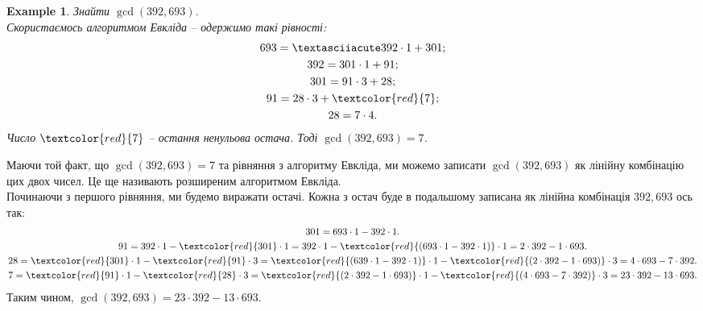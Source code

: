 \documentclass[a4paper, 10pt]{article}
\theoremstyle{theoremdd}
\theoremstyle{theoremdd}
\theoremstyle{theoremdd}
\theoremstyle{theoremdd}
\newtheorem{example}[theorem]{Example}
\theoremstyle{theoremdd}
\theoremstyle{theoremdd}
\theoremstyle{theoremdd}
\theoremstyle{theoremdd}
\begin{document}
\begin{example}
\label{gcd using Euclidean}
Знайти $\gcd(392, 693)$.\\
Скористаємось алгоритмом Евкліда -- одержимо такі рівності:
\begin{gather*}
693 =´392 \cdot 1 + 301; \\
392 = 301 \cdot 1 + 91; \\
301 = 91 \cdot 3 + 28; \\
91 = 28 \cdot 3 + \textcolor{red}{7}; \\
28 = 7 \cdot 4.
\end{gather*}
Число $\textcolor{red}{7}$ -- остання ненульова остача. Тоді $\gcd(392, 693) = 7$.
\end{example}

Маючи той факт, що $\gcd(392, 693) = 7$ та рівняння з алгоритму Евкліда, ми можемо записати $\gcd(392, 693)$ як лінійну комбінацію цих двох чисел. Це ще називають розширеним алгоритмом Евкліда.\\
Починаючи з першого рівняння, ми будемо виражати остачі. Кожна з остач буде в подальшому записана як лінійна комбінація $392, 693$ ось так:
\begin{gather*}
301 = 693 \cdot 1 - 392 \cdot 1. \\
91 = 392 \cdot 1 - \textcolor{red}{301} \cdot 1 = 392 \cdot 1 - \textcolor{red}{(693 \cdot 1 - 392 \cdot 1)} \cdot 1 = 2 \cdot 392 - 1 \cdot 693.\\
28 = \textcolor{red}{301} \cdot 1 - \textcolor{red}{91} \cdot 3 = \textcolor{red}{(639 \cdot 1 - 392 \cdot 1)} \cdot 1 - \textcolor{red}{(2 \cdot 392 - 1 \cdot 693)} \cdot 3 = 4 \cdot 693 - 7 \cdot 392.\\
7 = \textcolor{red}{91} \cdot 1 - \textcolor{red}{28} \cdot 3 = \textcolor{red}{(2 \cdot 392 - 1 \cdot 693)} \cdot 1 - \textcolor{red}{(4 \cdot 693 - 7 \cdot 392)} \cdot 3 = 23 \cdot 392 - 13 \cdot 693.
\end{gather*}
Таким чином, $\gcd(392, 693) = 23 \cdot 392 - 13 \cdot 693$.
\end{document}
